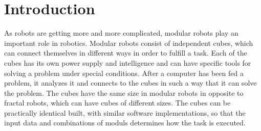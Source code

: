 \chapter{Introduction}\label{chapter:introduction}

As robots are getting more and more complicated, modular robots play an important role in robotics. Modular robots consist of independent cubes, which can connect themselves in different ways in order to fulfill a task. Each of the cubes has its own power supply and intelligence and can have specific tools for solving a problem under special conditions. After a computer has been fed a problem, it analyzes it and connects to the cubes in such a way that it can solve the problem. The cubes have the same size in modular robots in opposite to fractal robots, which can have cubes of different sizes. The cubes can be practically identical built, with similar software implementations, so that the input data and combinations of moduls determines how the task is executed.